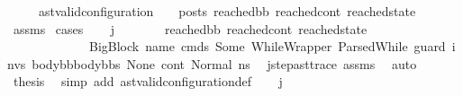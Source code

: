 \begin{isabellebody}
\ \ \ \ \ {\isachardoublequoteopen}{\isacharparenleft}{\kern0pt}ast{\isacharunderscore}{\kern0pt}valid{\isacharunderscore}{\kern0pt}configuration\ {\isasymLambda}\ {\isasymGamma}\ {\isasymOmega}\ posts\ reached{\isacharunderscore}{\kern0pt}bb\ reached{\isacharunderscore}{\kern0pt}cont\ reached{\isacharunderscore}{\kern0pt}state{\isacharparenright}{\kern0pt}{\isachardoublequoteclose}\isanewline
%
\isadelimproof
\ \ %
\endisadelimproof
%
\isatagproof
{}\isamarkupfalse%
\ assms\isanewline
{}\isamarkupfalse%
\ cases\isanewline
\ \ \isamarkupfalse%
\ {\isachardoublequoteopen}j\ {\isacharequal}{\kern0pt}\ {}{\isachardoublequoteclose}\isanewline
\ \ \isamarkupfalse%
\ \isamarkupfalse%
\ {\isachardoublequoteopen}{\isacharparenleft}{\kern0pt}reached{\isacharunderscore}{\kern0pt}bb{\isacharcomma}{\kern0pt}\ reached{\isacharunderscore}{\kern0pt}cont{\isacharcomma}{\kern0pt}\ reached{\isacharunderscore}{\kern0pt}state{\isacharparenright}{\kern0pt}\ {\isacharequal}{\kern0pt}\ \isanewline
\ \ \ \ \ \ \ \ \ \ \ \ \ {\isacharparenleft}{\kern0pt}{\isacharparenleft}{\kern0pt}BigBlock\ name\ cmds\ {\isacharparenleft}{\kern0pt}Some\ {\isacharparenleft}{\kern0pt}WhileWrapper\ {\isacharparenleft}{\kern0pt}ParsedWhile\ guard\ invs\ {\isacharparenleft}{\kern0pt}body{\isacharunderscore}{\kern0pt}bb{}{\isacharhash}{\kern0pt}body{\isacharunderscore}{\kern0pt}bbs{\isacharparenright}{\kern0pt}{\isacharparenright}{\kern0pt}{\isacharparenright}{\kern0pt}{\isacharparenright}{\kern0pt}\ None{\isacharparenright}{\kern0pt}{\isacharcomma}{\kern0pt}\ cont{}{\isacharcomma}{\kern0pt}\ Normal\ ns{}{\isacharparenright}{\kern0pt}{\isachardoublequoteclose}\ \isamarkupfalse%
\ j{\isacharunderscore}{\kern0pt}step{\isacharunderscore}{\kern0pt}ast{\isacharunderscore}{\kern0pt}trace\ assms{\isacharparenleft}{\kern0pt}{}{\isacharparenright}{\kern0pt}\ \isamarkupfalse%
\ auto\isanewline
\ \ \isamarkupfalse%
\ {\isacharquery}{\kern0pt}thesis\ \isamarkupfalse%
\ {\isacharparenleft}{\kern0pt}simp\ add{\isacharcolon}{\kern0pt}\ ast{\isacharunderscore}{\kern0pt}valid{\isacharunderscore}{\kern0pt}configuration{\isacharunderscore}{\kern0pt}def{\isacharparenright}{\kern0pt}\isanewline
{}\isamarkupfalse%
\isanewline
\ \ \isamarkupfalse%
\ {\isachardoublequoteopen}j\ {\isasymnoteq}\ {}{\isachardoublequoteclose}\isanewline

\end{isabellebody}
